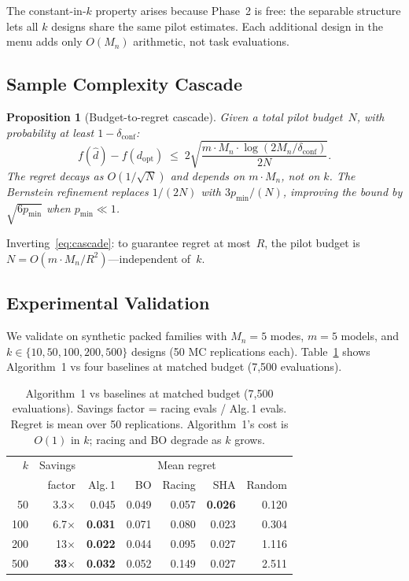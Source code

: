 \documentclass[11pt]{article}
\newtheorem{proposition}{Proposition}
\newcommand{\Mn}{M_n}
\newcommand{\pmin}{p_{\min}}
\newcommand{\dconf}{\delta_{\mathrm{conf}}}
\begin{document}
The constant-in-$k$ property arises because Phase~2 is free: the
separable structure lets all $k$ designs share the same pilot estimates.
Each additional design in the menu adds only $O(\Mn)$ arithmetic, not
task evaluations.

\subsection{Sample Complexity Cascade}

\begin{proposition}[Budget-to-regret cascade]
\label{prop:cascade}
Given a total pilot budget~$N$, with probability at least $1 - \dconf$:
\begin{equation}
\label{eq:cascade}
  f(\hat{d}) - f(d_{\mathrm{opt}})
  \;\le\;
  2\sqrt{\frac{m \cdot \Mn \cdot \log(2\Mn/\dconf)}{2N}}.
\end{equation}
The regret decays as $O(1/\sqrt{N})$ and depends on $m \cdot \Mn$, not
on $k$.  The Bernstein refinement replaces $1/(2N)$ with
$3\pmin/(N)$, improving the bound by $\sqrt{6\pmin}$ when $\pmin \ll 1$.
\end{proposition}

Inverting~\eqref{eq:cascade}: to guarantee regret at most~$R$, the pilot
budget is $N = O(m \cdot \Mn / R^2)$---independent of~$k$.

\subsection{Experimental Validation}
\label{sec:exp10}

We validate on synthetic packed families with $\Mn{=}5$ modes, $m{=}5$ models, and $k \in \{10, 50, 100, 200, 500\}$ designs (50 MC replications each). Table~\ref{tab:exp-combined} shows Algorithm~1 vs four baselines at matched budget (7,500 evaluations).

\begin{table}[t]
\centering
\caption{Algorithm~1 vs baselines at matched budget (7,500 evaluations). Savings factor = racing evals / Alg.\,1 evals. Regret is mean over 50 replications. Algorithm~1's cost is $O(1)$ in $k$; racing and BO degrade as $k$ grows.}
\label{tab:exp-combined}
\small
\begin{tabular}{@{}rrrrrrr@{}}
\toprule
$k$ & Savings & \multicolumn{5}{c}{Mean regret} \\
    & factor  & Alg.\,1 & BO & Racing & SHA & Random \\
\midrule
50  & 3.3$\times$  & 0.045 & 0.049 & 0.057 & \textbf{0.026} & 0.120 \\
100 & 6.7$\times$  & \textbf{0.031} & 0.071 & 0.080 & 0.023 & 0.304 \\
200 & 13$\times$   & \textbf{0.022} & 0.044 & 0.095 & 0.027 & 1.116 \\
500 & \textbf{33$\times$} & \textbf{0.032} & 0.052 & 0.149 & 0.027 & 2.511 \\
\bottomrule
\end{tabular}
\end{table}
\end{document}
